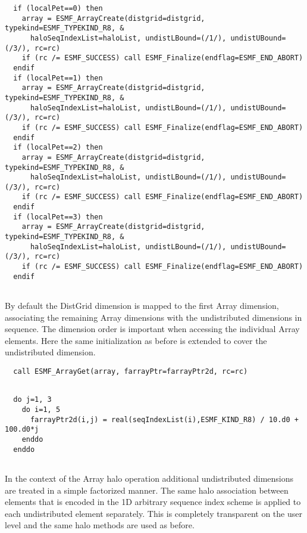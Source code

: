  \begin{verbatim}
  if (localPet==0) then
    array = ESMF_ArrayCreate(distgrid=distgrid, typekind=ESMF_TYPEKIND_R8, &
      haloSeqIndexList=haloList, undistLBound=(/1/), undistUBound=(/3/), rc=rc)
    if (rc /= ESMF_SUCCESS) call ESMF_Finalize(endflag=ESMF_END_ABORT)
  endif
  if (localPet==1) then
    array = ESMF_ArrayCreate(distgrid=distgrid, typekind=ESMF_TYPEKIND_R8, &
      haloSeqIndexList=haloList, undistLBound=(/1/), undistUBound=(/3/), rc=rc)
    if (rc /= ESMF_SUCCESS) call ESMF_Finalize(endflag=ESMF_END_ABORT)
  endif
  if (localPet==2) then
    array = ESMF_ArrayCreate(distgrid=distgrid, typekind=ESMF_TYPEKIND_R8, &
      haloSeqIndexList=haloList, undistLBound=(/1/), undistUBound=(/3/), rc=rc)
    if (rc /= ESMF_SUCCESS) call ESMF_Finalize(endflag=ESMF_END_ABORT)
  endif
  if (localPet==3) then
    array = ESMF_ArrayCreate(distgrid=distgrid, typekind=ESMF_TYPEKIND_R8, &
      haloSeqIndexList=haloList, undistLBound=(/1/), undistUBound=(/3/), rc=rc)
    if (rc /= ESMF_SUCCESS) call ESMF_Finalize(endflag=ESMF_END_ABORT)
  endif
 
\end{verbatim}
 

   By default the DistGrid dimension is mapped to the first Array dimension, 
   associating the remaining Array dimensions with the undistributed dimensions
   in sequence. The dimension order is important when accessing the individual
   Array elements. Here the same initialization as before is extended to 
   cover the undistributed dimension. 

 \begin{verbatim}
  call ESMF_ArrayGet(array, farrayPtr=farrayPtr2d, rc=rc)
 
\end{verbatim}
 

 \begin{verbatim}
  do j=1, 3
    do i=1, 5
      farrayPtr2d(i,j) = real(seqIndexList(i),ESMF_KIND_R8) / 10.d0 + 100.d0*j
    enddo
  enddo
 
\end{verbatim}
 

   In the context of the Array halo operation additional undistributed dimensions
   are treated in a simple factorized manner. The same halo association between
   elements that is encoded in the 1D arbitrary sequence index scheme is
   applied to each undistributed element separately. This is completely 
   transparent on the user level and the same halo methods are used as before. 

